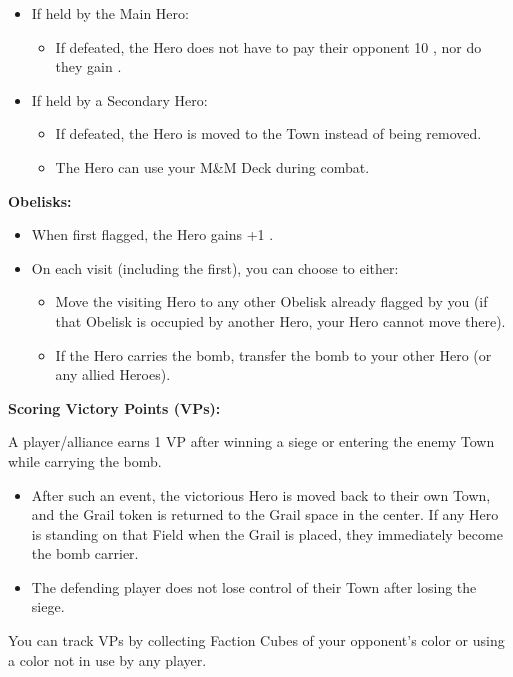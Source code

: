 \begin{multicols}{2}
\begin{itemize}
  \item If held by the Main Hero:
  \begin{itemize}
    \item If defeated, the Hero does not have to pay their opponent 10 , nor do they gain .
  \end{itemize}

  \item If held by a Secondary Hero:
  \begin{itemize}
    \item If defeated, the Hero is moved to the Town instead of being removed.
    \item The Hero can use your M\&M Deck during combat.
  \end{itemize}
\end{itemize}

\textbf{Obelisks:}

\begin{itemize}
  \item When first flagged, the Hero gains +1 .
  \item On each visit (including the first), you can choose to either:
  \begin{itemize}
    \item Move the visiting Hero to any other Obelisk already flagged by you (if that Obelisk is occupied by another Hero, your Hero cannot move there).
    \item If the Hero carries the bomb, transfer the bomb to your other Hero (or any allied Heroes).
  \end{itemize}
\end{itemize}

\textbf{Scoring Victory Points (VPs):}

A player/alliance earns 1 VP after winning a siege or entering the enemy Town while carrying the bomb.
\begin{itemize}
  \item After such an event, the victorious Hero is moved back to their own Town, and the Grail token is returned to the Grail space in the center. If any Hero is standing on that Field when the Grail is placed, they immediately become the bomb carrier.
  \item The defending player does not lose control of their Town after losing the siege.
\end{itemize}

You can track VPs by collecting Faction Cubes of your opponent's color or using a color not in use by any player.

\end{multicols}

